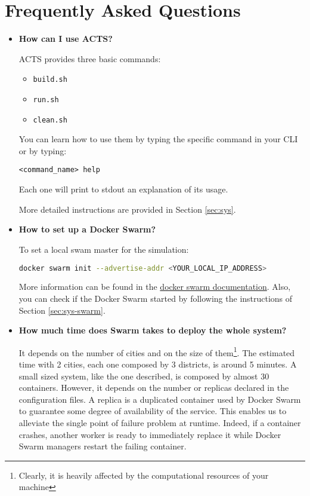 \section{Frequently Asked Questions}\label{sec:faq}

\begin{itemize}

\item \textbf{How can I use ACTS?}

ACTS provides three basic commands:
\begin{itemize}
	\item \texttt{build.sh}
	\item \texttt{run.sh}
	\item \texttt{clean.sh}
\end{itemize}
You can learn how to use them by typing the specific command in your CLI or
by typing:
\begin{lstlisting}
<command_name> help
\end{lstlisting}
Each one will print to stdout an explanation of its usage.

More detailed instructions are provided in Section \ref{sec:sys}.

\item \textbf{How to set up a Docker Swarm?}

To set a local swam master for the simulation:

\begin{lstlisting}[language=bash]
docker swarm init --advertise-addr <YOUR_LOCAL_IP_ADDRESS>
\end{lstlisting}

More information can be found in the \href{https://docs.docker.com/engine/swarm/swarm-tutorial/create-swarm/}{docker swarm documentation}.
Also, you can check if the Docker Swarm started by following the instructions
of Section \ref{sec:sys-swarm}.

\item \textbf{How much time does Swarm takes to deploy the whole system?}

It depends on the number of cities and on the size of them\footnote{Clearly,
it is heavily affected by the computational resources of your machine}.
The estimated time with 2 cities, each one
composed by 3 districts, is around 5 minutes.
A small sized system, like
the one described, is composed by almost 30 containers.
However, it depends on the number or replicas declared in the configuration
files.
A replica is a duplicated container used by Docker Swarm to guarantee some
degree of availability of the service. This enables us to alleviate the single
point of failure problem at runtime. Indeed, if a container crashes, another
worker is ready to immediately replace it while Docker Swarm managers restart
the failing container.


\end{itemize}
